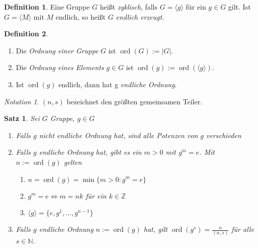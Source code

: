 \documentclass[12pt]{scrartcl} %
\DeclareMathOperator{\ord}{ord}
\newtheorem{thm}{Satz}[section]
\theoremstyle{definition}
\newtheorem*{defn}{Definition}
\theoremstyle{remark}
\newtheorem*{notation}{Notation}
\begin{document}
\begin{defn}
	Eine Gruppe $G$ heißt \emph{zyklisch}, falls $G = \langle g \rangle$ für ein $g \in G$ gilt. \newline
	Ist $G = \langle M \rangle$ mit $M$ endlich, so heißt $G$ \emph{endlich erzeugt}.
\end{defn}

\begin{defn}
	\begin{enumerate}[label=(\roman*)]
	\item Die \emph{Ordnung einer Gruppe} $G$ ist $\ord(G):=\vert G \vert$.
	\item Die \emph{Ordnung eines Elements} $g \in G$ ist $\ord(g):=\ord(\langle g \rangle)$.
	\item Ist $\ord(g)$ endlich, dann hat g \emph{endliche Ordnung}.
	\end{enumerate}
\end{defn}

\begin{notation}
	$(n,s)$ bezeichnet den größten gemeinsamen Teiler.
\end{notation}

\begin{thm}
	Sei $G$ Gruppe, $g \in G$
	\begin{enumerate}
	\item Falls \(g\) nicht endliche Ordnung hat, sind alle Potenzen von \(g\) verschieden
	\item Falls \(g\) endliche Ordnung hat, gibt es ein \(m > 0\) mit \(g^m = e\).
		Mit \(n := \ord(g)\) gelten
		\begin{enumerate}[label=(\alph*)]
		\item $n = \ord(g) = \min \lbrace m>0 : g^{m}=e \rbrace$
		\item $g^{m}=e \Longleftrightarrow m=nk$ für ein $k \in \mathbb{Z}$
		\item $\langle g \rangle = \lbrace e, g^{1},\dots,g^{n-1}\rbrace$
		\end{enumerate}
	\item Falls \(g\) endliche Ordnung $n := \ord(g)$ hat, gilt $\ord(g^{s}) = \frac{n}{(n,s)}$ für alle \(s \in \mathbb N\).
	\end{enumerate}
\end{thm}
\end{document}
